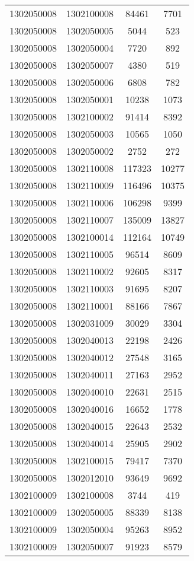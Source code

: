 \begin{longtable}[h]{llcc}
		1302050008 & 1302100008 & 84461 & 7701\\
		1302050008 & 1302050005 & 5044 & 523\\
		1302050008 & 1302050004 & 7720 & 892\\
		1302050008 & 1302050007 & 4380 & 519\\
		1302050008 & 1302050006 & 6808 & 782\\
		1302050008 & 1302050001 & 10238 & 1073\\
		1302050008 & 1302100002 & 91414 & 8392\\
		1302050008 & 1302050003 & 10565 & 1050\\
		1302050008 & 1302050002 & 2752 & 272\\
		1302050008 & 1302110008 & 117323 & 10277\\
		1302050008 & 1302110009 & 116496 & 10375\\
		1302050008 & 1302110006 & 106298 & 9399\\
		1302050008 & 1302110007 & 135009 & 13827\\
		1302050008 & 1302100014 & 112164 & 10749\\
		1302050008 & 1302110005 & 96514 & 8609\\
		1302050008 & 1302110002 & 92605 & 8317\\
		1302050008 & 1302110003 & 91695 & 8207\\
		1302050008 & 1302110001 & 88166 & 7867\\
		1302050008 & 1302031009 & 30029 & 3304\\
		1302050008 & 1302040013 & 22198 & 2426\\
		1302050008 & 1302040012 & 27548 & 3165\\
		1302050008 & 1302040011 & 27163 & 2952\\
		1302050008 & 1302040010 & 22631 & 2515\\
		1302050008 & 1302040016 & 16652 & 1778\\
		1302050008 & 1302040015 & 22643 & 2532\\
		1302050008 & 1302040014 & 25905 & 2902\\
		1302050008 & 1302100015 & 79417 & 7370\\
		1302050008 & 1302012010 & 93649 & 9692\\
		1302100009 & 1302100008 & 3744 & 419\\
		1302100009 & 1302050005 & 88339 & 8138\\
		1302100009 & 1302050004 & 95263 & 8952\\
		1302100009 & 1302050007 & 91923 & 8579\\

\end{longtable}
